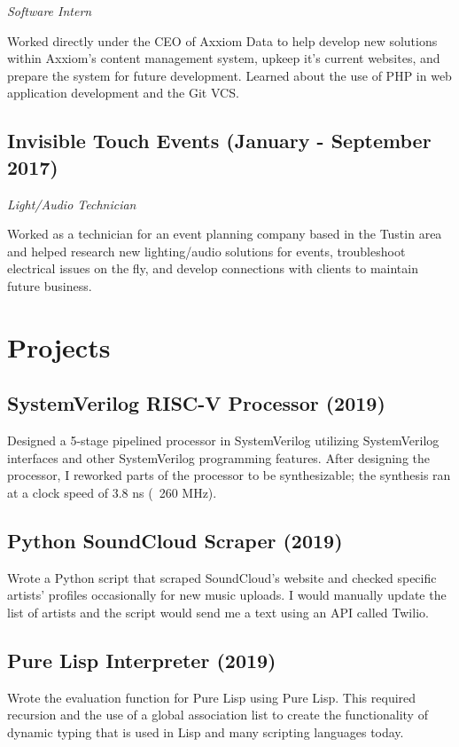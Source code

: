 \documentclass{article}
\begin{document}
\noindent\textit{Software Intern}

Worked directly under the CEO of Axxiom Data to help develop new solutions within Axxiom's
content management system, upkeep it's current websites, and prepare the system for future development. Learned about 
the use of PHP in web application development and the Git VCS.

\subsection{Invisible Touch Events (January - September 2017)} 

\noindent\textit{Light/Audio Technician}

Worked as a technician for an event planning company based in the Tustin area and helped research
new lighting/audio solutions for events, troubleshoot electrical issues on the fly, and develop 
connections with clients to maintain future business.

\section{Projects}

\subsection{SystemVerilog RISC-V Processor (2019)}

Designed a 5-stage pipelined processor in SystemVerilog utilizing SystemVerilog interfaces and other 
SystemVerilog programming features. After designing the processor, I reworked parts of the processor 
to be synthesizable; the synthesis ran at a clock speed of 3.8 ns (~260 MHz).

\subsection{Python SoundCloud Scraper (2019)}

Wrote a Python script that scraped SoundCloud's website and checked specific artists' profiles occasionally for new music uploads. 
I would manually update the list of artists and the script would send me a text using an API called Twilio.

\subsection{Pure Lisp Interpreter (2019)}

Wrote the evaluation function for Pure Lisp using Pure Lisp. This required recursion and the use of a global 
association list to create the functionality of dynamic typing that is used in Lisp and many scripting languages today.
\end{document}
